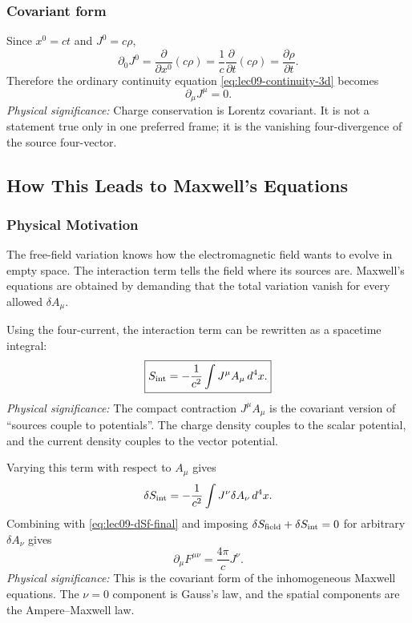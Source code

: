 \subsubsection*{Covariant form}

Since $x^0=ct$ and $J^0=c\rho$,
\begin{equation}\label{eq:lec09-time-part}
  \partial_0 J^0
  =
  \frac{\partial}{\partial x^0}(c\rho)
  =
  \frac{1}{c}\frac{\partial}{\partial t}(c\rho)
  =
  \frac{\partial\rho}{\partial t}.
\end{equation}
Therefore the ordinary continuity equation
\eqref{eq:lec09-continuity-3d} becomes
\begin{equation}\label{eq:lec09-continuity-covariant}
  \boxed{
  \partial_\mu J^\mu=0.
  }
\end{equation}
\textit{Physical significance:} Charge conservation is Lorentz covariant.  It
is not a statement true only in one preferred frame; it is the vanishing
four-divergence of the source four-vector.

\subsection{How This Leads to Maxwell's Equations}\label{subsec:lec09-next-step}

\subsubsection*{Physical Motivation}
The free-field variation knows how the electromagnetic field wants to evolve in
empty space.  The interaction term tells the field where its sources are.
Maxwell's equations are obtained by demanding that the total variation vanish
for every allowed $\delta A_\mu$.

Using the four-current, the interaction term can be rewritten as a spacetime
integral:
\begin{equation}\label{eq:lec09-Sint-current}
  \boxed{
  S_{\rm int}
  =
  -\frac{1}{c^2}\int J^\mu A_\mu\,d^4x .
  }
\end{equation}
\textit{Physical significance:} The compact contraction $J^\mu A_\mu$ is the
covariant version of ``sources couple to potentials''.  The charge density
couples to the scalar potential, and the current density couples to the vector
potential.

Varying this term with respect to $A_\mu$ gives
\begin{equation}\label{eq:lec09-dSint}
  \delta S_{\rm int}
  =
  -\frac{1}{c^2}\int J^\nu\delta A_\nu\,d^4x .
\end{equation}
Combining with \eqref{eq:lec09-dSf-final} and imposing
$\delta S_{\rm field}+\delta S_{\rm int}=0$ for arbitrary $\delta A_\nu$ gives
\begin{equation}\label{eq:lec09-maxwell-covariant}
  \boxed{
  \partial_\mu F^{\mu\nu}
  =
  \frac{4\pi}{c}J^\nu .
  }
\end{equation}
\textit{Physical significance:} This is the covariant form of the inhomogeneous
Maxwell equations.  The $\nu=0$ component is Gauss's law, and the spatial
components are the Ampere--Maxwell law.

